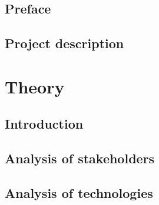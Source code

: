 
\raggedbottom



\frontmatter
 

\cleardoublepage

\cleardoublepage

\chapter*{Preface}


\cleardoublepage

{}
\tableofcontents*

\mainmatter
  

\chapter{Project description}


\part{Theory}
\chapter{Introduction}


\chapter{Analysis of stakeholders}


\chapter{Analysis of technologies}


\begingroup
 \raggedright
 
\endgroup

\appendix
\clearforchapter


